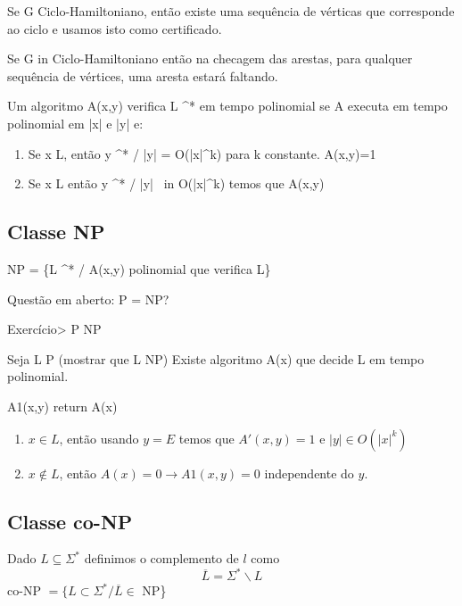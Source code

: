 \documentclass[a4paper,oneside,article,table]{article}
\begin{document}
            Se G \in Ciclo-Hamiltoniano, então existe uma sequência de vérticas que corresponde ao ciclo e usamos isto como certificado.

            Se G \not in Ciclo-Hamiltoniano então na checagem das arestas, para qualquer sequência de vértices, uma aresta estará faltando.

            Um algoritmo A(x,y) verifica L \subseteq \Sigma^* em tempo polinomial se A executa em tempo polinomial em |x| e |y| e:
            \begin{enumerate}
                \item Se x \in L, então \exists y \in \Sigma^* / |y| = O(|x|^k) para k constante. A(x,y)=1
                \item Se x \notin L então \forall y \in \Sigma^* / |y| \ in O(|x|^k) temos que A(x,y) 

            \end{enumerate}

    \subsection{Classe NP}

        NP = \{L \subseteq \Sigma^* / \exists A(x,y) polinomial que verifica L\}

        Questão em aberto: P = NP?

        Exercício> P \subseteq NP

        Seja L \in P (mostrar que L \in NP) \arrowright Existe algoritmo A(x) que decide L em tempo polinomial.

        A1(x,y)
            return A(x)

        \begin{enumerate}
            \item $x \in L$, então usando $y = E$ temos que $A'(x,y) = 1$ e $|y| \in O(|x|^k)$
            \item $x \notin L$, então $A(x) = 0 \rightarrow A1(x,y) = 0$ independente do $y$.
        \end{enumerate}

    \subsection{Classe co-NP}

        Dado $L \subseteq \Sigma^*$ definimos o complemento de $l$ como
        \[\overline{L} = \Sigma^* \backslash L\]
        co-NP $= \{L \subset \Sigma^* / \overline{L} \in$ NP\}
\end{document}
